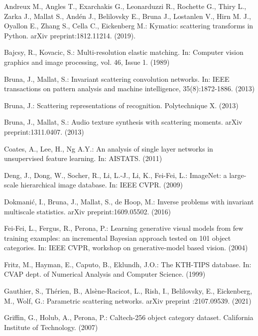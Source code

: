 \documentclass[runningheads]{llncs}
\begin{document}
\begin{thebibliography}{8}

Andreux M., Angles T., Exarchakis G., Leonarduzzi R., Rochette G., Thiry L., Zarka J., Mallat S., Andén J., Belilovsky E., Bruna J., Lostanlen V., Hirn M. J., Oyallon E., Zhang S., Cella C., Eickenberg M.:  Kymatio: scattering transforms in Python. arXiv preprint:1812.11214. (2019).

Bajcsy, R., Kovacic, S.: Multi-resolution elastic matching. In: Computer vision graphics and image processing, vol. 46, Issue 1. (1989)

Bruna, J., Mallat, S.: Invariant scattering convolution networks. In: IEEE transactions on pattern analysis and machine intelligence, 35(8):1872-1886. (2013)

Bruna, J.: Scattering representations of recognition. Polytechnique X. (2013)

Bruna, J., Mallat, S.: Audio texture synthesis with scattering moments. arXiv preprint:1311.0407. (2013)

Coates, A., Lee, H., Ng A.Y.: An analysis of single layer networks in unsupervised feature learning. In: AISTATS. (2011)

Deng, J., Dong, W., Socher, R., Li, L.-J., Li, K., Fei-Fei, L.: ImageNet: a large-scale hierarchical image database. In: IEEE CVPR. (2009)

Dokmanić, I., Bruna, J., Mallat, S., de Hoop, M.: Inverse problems with invariant multiscale statistics. arXiv preprint:1609.05502. (2016)

Fei-Fei, L., Fergus, R., Perona, P.: Learning generative visual models from few training examples: an incremental Bayesian approach tested on 101 object categories. In: IEEE CVPR, workshop on generative-model based vision. (2004)

Fritz, M., Hayman, E., Caputo, B., Eklundh, J.O.: The KTH-TIPS database. In: CVAP dept. of Numerical Analysis and Computer Science. (1999)

Gauthier, S., Thérien, B., Alsène-Racicot, L., Rish, I., Belilovsky, E., Eickenberg, M., Wolf, G.: Parametric scattering networks. arXiv preprint :2107.09539. (2021)

Griffin, G., Holub, A., Perona, P.: Caltech-256 object category dataset. California Institute of Technology. (2007)


\end{thebibliography}
\end{document}
